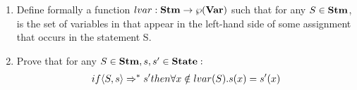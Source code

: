 \newcommand{\lvar}[1]{\textrm{\normalfont{\texttt{lvar(#1)}}}}
\newcommand{\exTwo}
{$if~\confSs{S}{s}\Rar{*}s'~then~\forall{} x \notin lvar(S).s(x)=s'(x)$}
\newcommand{\exTwoM}[1]
{$if~\confSs{#1}{s}\Rar{*}s'~then~\forall{} x \notin lvar(#1).s(x)=s'(x)$}
\newcommand{\exTwoMM}[3]
{$if~\confSs{#1}{#2}\Rar{*}#3~then~\forall{} x \notin lvar(#1).#2(x)=#3(x)$}

{
	\begin{enumerate}
	\item Define formally a function $lvar:\mbox{\textbf{Stm}}\rightarrow\wp(\mbox{\textbf{Var}})$ such that
	for any $S\in\mbox{\textbf{Stm}}$, \lvar{S} is the set of variables in \var{} that appear
	in the left-hand side of some assignment that occurs in the statement S.
	\item Prove that for any $S\in\mbox{\textbf{Stm}}, s,s'\in\mbox{\textbf{State}}:$ \\
	\begin{align*}
	if \langle{}S, s\rangle{}\Rightarrow^{*}s' then \forall{} x \notin lvar(S).s(x)=s'(x)
	\end{align*}
	\end{enumerate}
}
